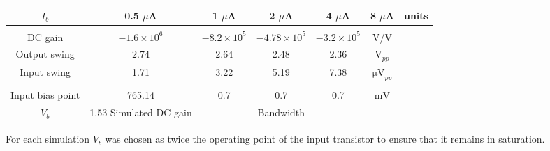 \documentclass{article}
\begin{document}
\begin{enumerate}
{        \begin{tabular}{c | c c c c | c}
$I_b$                    & 0.5 $\mu$A            & 1 $\mu$A              & 2 $\mu$A              & 4 $\mu$A              & 8 $\mu$A & units \\
\hline                   & & & & &\\
DC gain                  & $-1.6 \times 10^{6}$  & $-8.2 \times 10^{5}$  & $-4.78 \times 10^{5}$  & $-3.2 \times 10^{5}$ & $\mathrm{V}$/$\mathrm{V}$ \\
Output swing             & 2.74                  & 2.64                  & 2.48                  & 2.36                  & $\mathrm{V}_{pp}$         \\
Input swing              & 1.71                  & 3.22                  & 5.19                  & 7.38                  & $\mathrm{\mu V}_{pp}$     \\
\hline \\
Input bias point         & 765.14                   & 0.7                   & 0.7                   & 0.7                   & $\mathrm{mV}$ \\
$V_b$                    & 1.53
Simulated DC gain        & &
Bandwidth                & \\
        \end{tabular}
        For each simulation $V_b$ was chosen as twice the operating point of 
        the input transistor to ensure that it remains in saturation.
       }
\end{enumerate}
\end{document}
